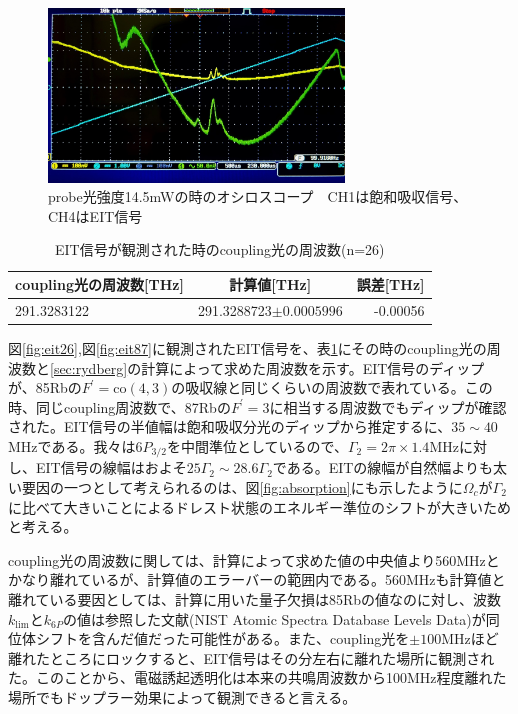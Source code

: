 \documentclass[dvipdfmx]{jsreport}
\begin{document}
\begin{figure}
\centering
\includegraphics[width=0.7\textwidth]{images/eit_high.jpg}
\caption{\label{fig:eit-high}probe光強度14.5mWの時のオシロスコープ　CH1は飽和吸収信号、CH4はEIT信号}
\end{figure}

\begin{table}[hbtp]
  \caption{EIT信号が観測された時のcoupling光の周波数(n=26)}
  \label{table:eit26}
  \centering
  \begin{tabular}{lcr}
    \hline
    coupling光の周波数[THz] & 計算値[THz] & 誤差[THz]  \\
    \hline
    291.3283122  & 291.3288723$\pm 0.0005996$ & -0.00056  \\
    \hline
  \end{tabular}
\end{table}
図\ref{fig:eit26},図\ref{fig:eit87}に観測されたEIT信号を、表\ref{table:eit26}にその時のcoupling光の周波数と\ref{sec:rydberg}の計算によって求めた周波数を示す。EIT信号のディップが、85Rbの$F^{'} = \text{co}(4,3)$の吸収線と同じくらいの周波数で表れている。この時、同じcoupling周波数で、87Rbの$F^{'} = 3$に相当する周波数でもディップが確認された。EIT信号の半値幅は飽和吸収分光のディップから推定するに、$35 \sim 40$MHzである。我々は$6P_{3/2}$を中間準位としているので、$\Gamma_2 = 2\pi \times 1.4$MHzに対し、EIT信号の線幅はおよそ$25\Gamma_2 \sim 28.6\Gamma_2$である。EITの線幅が自然幅よりも太い要因の一つとして考えられるのは、図\ref{fig:absorption}にも示したように$\Omega_c$が$\Gamma_2$に比べて大きいことによるドレスト状態のエネルギー準位のシフトが大きいためと考える。

coupling光の周波数に関しては、計算によって求めた値の中央値より560MHzとかなり離れているが、計算値のエラーバーの範囲内である。560MHzも計算値と離れている要因としては、計算に用いた量子欠損は85Rbの値なのに対し、波数$k_{\text{lim}}$と$k_{6P}$の値は参照した文献\cite{nist}(NIST Atomic Spectra Database Levels Data)が同位体シフトを含んだ値だった可能性がある。また、coupling光を$\pm 100$MHzほど離れたところにロックすると、EIT信号はその分左右に離れた場所に観測された。このことから、電磁誘起透明化は本来の共鳴周波数から100MHz程度離れた場所でもドップラー効果によって観測できると言える。
\end{document}
